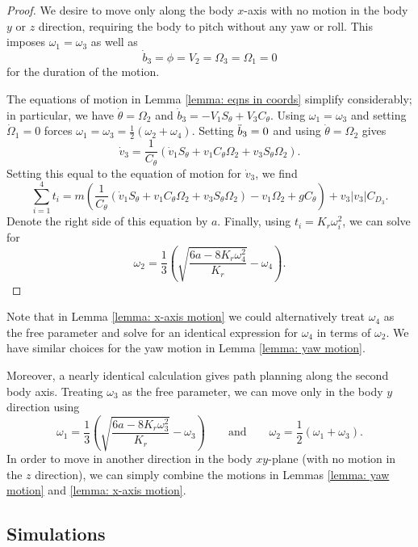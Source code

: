 \documentclass{aims}
\theoremstyle{definition}
\begin{document}
\begin{proof}
We desire to move only along the body $x$-axis with no motion in the body $y$ or $z$ direction, requiring the body to pitch without any yaw or roll.  This imposes $\omega_1=\omega_3$ as well as 
$$\dot{b}_3=\phi=V_2=\Omega_3=\Omega_1=0
$$
for the duration of the motion.

The equations of motion in Lemma \ref{lemma: eqns in coords} simplify considerably; in particular, we have $\dot{\theta}=\Omega_2$ and
$\dot{b}_3=-V_1S_\theta+V_3C_\theta.$
Using $\omega_1=\omega_3$ and setting $\dot{\Omega}_1=0$ forces $\omega_1=\omega_3=\frac{1}{2}(\omega_2+\omega_4)$.  Setting $\Ddot{b}_3=0$ and using $\dot{\theta}=\Omega_2$ gives
$$\dot{v}_3=\frac{1}{C_\theta}(\dot{v}_1S_\theta+v_1C_\theta\Omega_2+v_3S_\theta\Omega_2).
$$
Setting this equal to the equation of motion for $\dot{v}_3$, we find 
$$\sum_{i=1}^4 t_i = m\left(\frac{1}{C_\theta}(\dot{v}_1S_\theta+v_1C_\theta\Omega_2+v_3S_\theta\Omega_2)-v_1\Omega_2+gC_\theta\right)+v_3|v_3|C_{D_3}.
$$
Denote the right side of this equation by $a$.
Finally, using $t_i=K_r\omega_i^2$, we can solve for
$$
\omega_2=\frac{1}{3}\left(\sqrt{\frac{6a-8K_r\omega_4^2}{K_r}}-\omega_4\right).
$$
\end{proof}

Note that in Lemma \ref{lemma: x-axis motion} we could alternatively treat $\omega_4$ as the free parameter and solve for an identical expression for $\omega_4$ in terms of $\omega_2$.  We have similar choices for the yaw motion in Lemma \ref{lemma: yaw motion}.

Moreover, a nearly identical calculation gives path planning along the second body axis.  Treating $\omega_3$ as the free parameter, we can move only in the body $y$ direction using 
\begin{equation*}
    \omega_1=\frac{1}{3}\left(\sqrt{\frac{6a-8K_r\omega_3^2}{K_r}}-\omega_3\right) \qquad \text{and} \qquad \omega_2=\frac{1}{2}(\omega_1+\omega_3).
\end{equation*}
In order to move in another direction in the body $xy$-plane (with no motion in the $z$ direction), we can simply combine the motions in Lemmas \ref{lemma: yaw motion} and \ref{lemma: x-axis motion}.



\subsection{Simulations}\label{subsec: simulations}
\end{document}

